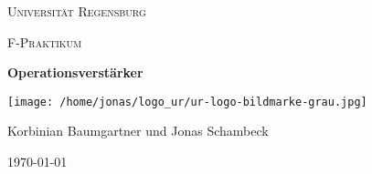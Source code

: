 \begin{titlepage}
	\centering
	{\scshape \LARGE Universität Regensburg \par}
	\vspace{1cm}
	{\scshape\Large F-Praktikum\par}
	\vspace{1.5cm}
	{\huge\bfseries Operationsverstärker\par}
	\vspace{2cm}
	\texttt{[image: /home/jonas/logo\_ur/ur-logo-bildmarke-grau.jpg]}\par
	\vfill
	{\large Korbinian Baumgartner und Jonas Schambeck\par}

	\vfill

	{\large \today\par}
\end{titlepage}
